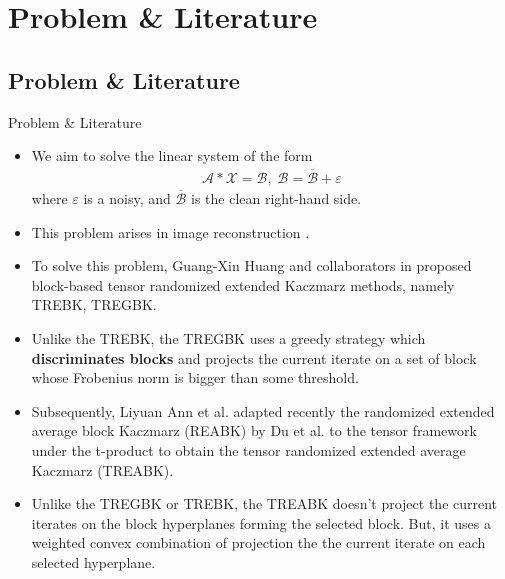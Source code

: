 \documentclass[aspectratio=169]{beamer}
\def\fm#1{\mathcal{#1}}
\def\fm#1{\mathcal{#1}}
\begin{document}
\section{Problem \& Literature }
\subsection{Problem \& Literature }
\begin{frame}{Problem \& Literature }
\begin{itemize}
    \item We aim to solve the linear system of the form
    \begin{align}
        \label{eq:eq-1}
            \fm A * \fm X =  \fm B, \; \fm B = \overline{\fm B} + \varepsilon
\end{align}
where $\varepsilon$ is a noisy, and $\overline{\fm B}$ is the clean right-hand side. 
\item This problem arises in image reconstruction \cite{kilmer2013third, du2021rrek,an2025randomized}.
\item To solve this problem, Guang-Xin Huang and collaborators in \cite{huang2024tensor} proposed block-based tensor randomized extended  Kaczmarz methods, namely TREBK, TREGBK.
\item Unlike the TREBK, the TREGBK uses a greedy strategy which \textbf{discriminates blocks}  and  projects the current iterate  on a set of block whose Frobenius norm is bigger than some threshold.
\end{itemize}
\end{frame}
\begin{frame}{}
\begin{itemize}
    \item Subsequently, Liyuan Ann et al. \cite{an2025randomized} adapted recently the randomized extended average block Kaczmarz (REABK) by  Du et al. \cite{du2020randomized} to the tensor framework under the t-product to obtain the tensor randomized extended average Kaczmarz (TREABK).
    \item Unlike the TREGBK or TREBK, the TREABK doesn't project the current iterates on the block hyperplanes forming the selected block. But, it uses a weighted convex combination of projection the the current iterate on each selected hyperplane. 
\end{itemize}
\end{frame}
\end{document}
